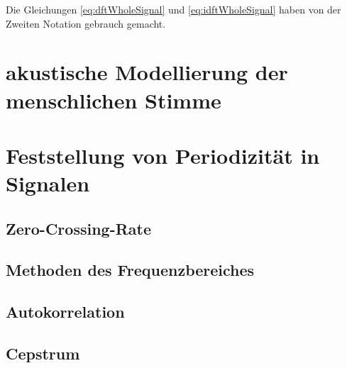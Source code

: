 Die Gleichungen \ref{eq:dftWholeSignal} und \ref{eq:idftWholeSignal} haben von der Zweiten Notation gebrauch gemacht. 



\section{akustische Modellierung der menschlichen Stimme}
\section{Feststellung von Periodizität in Signalen}
\subsection{Zero-Crossing-Rate}
\subsection{Methoden des Frequenzbereiches}
\subsection{Autokorrelation}
\subsection{Cepstrum}